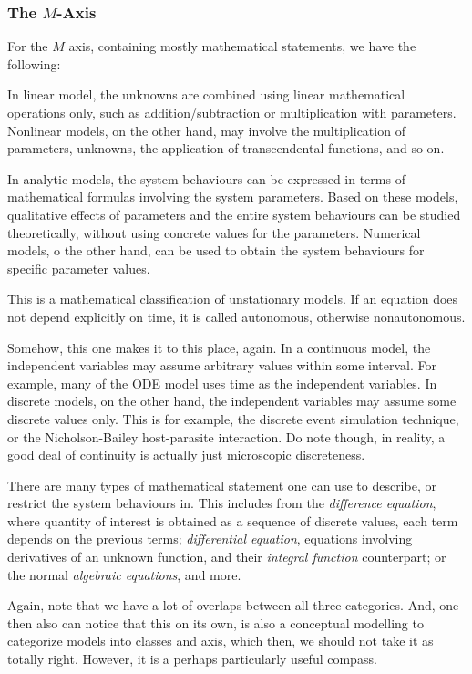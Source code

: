 \subsubsection{The $M$-Axis}

For the $M$ axis, containing mostly mathematical statements, we have the following:
\begin{description}[leftmargin=2pt,font=\normalfont\itshape\space]
    \item[Linear-nonlinear] In linear model, the unknowns are combined using linear mathematical operations only, such as addition/subtraction or multiplication with parameters. Nonlinear models, on the other hand, may involve the multiplication of parameters, unknowns, the application of transcendental functions, and so on. 
    \item[Analytical-numerical] In analytic models, the system behaviours can be expressed in terms of mathematical formulas involving the system parameters.  Based on these models, qualitative effects of parameters and the entire system behaviours can be studied theoretically, without using concrete values for the parameters. Numerical models, o the other hand, can be used to obtain the system behaviours for specific parameter values. 
    \item[Autonomous-nonautonomous] This is a mathematical classification of unstationary models. If an equation does not depend explicitly on time, it is called autonomous, otherwise nonautonomous. 
    \item[Continuous-discrete] Somehow, this one makes it to this place, again. In a continuous model, the independent variables may assume arbitrary values within some interval. For example, many of the ODE model uses time as the independent variables. In discrete models, on the other hand, the independent variables may assume some discrete values only. This is for example, the discrete event simulation technique, or the Nicholson-Bailey host-parasite interaction. Do note though, in reality, a good deal of continuity is actually just microscopic discreteness. 
    \item[Mathematical statement types] There are many types of mathematical statement one can use to describe, or restrict the system behaviours in. This includes from the \textit{difference equation}, where quantity of interest is obtained as a sequence of discrete values, each term depends on the previous terms; \textit{differential equation}, equations involving derivatives of an unknown function, and their \textit{integral function} counterpart; or the normal \textit{algebraic equations}, and more. 
\end{description}
Again, note that we have a lot of overlaps between all three categories. And, one then also can notice that this on its own, is also a conceptual modelling to categorize models into classes and axis, which then, we should not take it as totally right. However, it is a perhaps particularly useful compass. 


